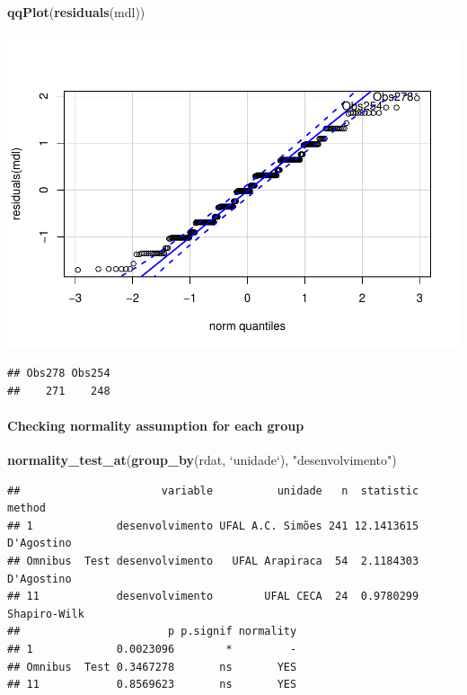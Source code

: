 \documentclass[]{article}
\newenvironment{Shaded}{\begin{snugshade}}{\end{snugshade}}
\newcommand{\DataTypeTok}[1]{\textcolor[rgb]{0.13,0.29,0.53}{#1}}
\newcommand{\KeywordTok}[1]{\textcolor[rgb]{0.13,0.29,0.53}{\textbf{#1}}}
\newcommand{\NormalTok}[1]{#1}
\newcommand{\StringTok}[1]{\textcolor[rgb]{0.31,0.60,0.02}{#1}}
\let\oldparagraph\paragraph
\renewcommand{\paragraph}[1]{\oldparagraph{#1}\mbox{}}
\begin{document}
\begin{Shaded}
\begin{Highlighting}[]
\KeywordTok{qqPlot}\NormalTok{(}\KeywordTok{residuals}\NormalTok{(mdl))}
\end{Highlighting}
\end{Shaded}

\includegraphics{factorialAnova_files/figure-latex/unnamed-chunk-7-1.pdf}

\begin{verbatim}
## Obs278 Obs254 
##    271    248
\end{verbatim}

\hypertarget{checking-normality-assumption-for-each-group}{%
\paragraph{Checking normality assumption for each
group}\label{checking-normality-assumption-for-each-group}}

\begin{Shaded}
\begin{Highlighting}[]
\KeywordTok{normality_test_at}\NormalTok{(}\KeywordTok{group_by}\NormalTok{(rdat, }\StringTok{`}\DataTypeTok{unidade}\StringTok{`}\NormalTok{), }\StringTok{"desenvolvimento"}\NormalTok{)}
\end{Highlighting}
\end{Shaded}

\begin{verbatim}
##                      variable          unidade   n  statistic       method
## 1             desenvolvimento UFAL A.C. Simões 241 12.1413615   D'Agostino
## Omnibus  Test desenvolvimento   UFAL Arapiraca  54  2.1184303   D'Agostino
## 11            desenvolvimento        UFAL CECA  24  0.9780299 Shapiro-Wilk
##                       p p.signif normality
## 1             0.0023096        *         -
## Omnibus  Test 0.3467278       ns       YES
## 11            0.8569623       ns       YES
\end{verbatim}
\end{document}

